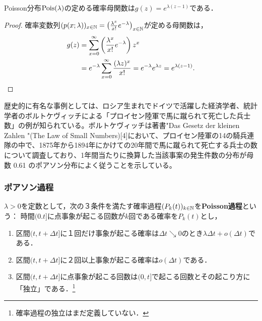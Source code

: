 \documentclass[uplatex,dvipdfmx]{jsreport}
\begin{document}
\begin{proposition}[Poisson分布の確率母関数]
    Poisson分布$\mathrm{Pois}(\lambda)$の定める確率母関数は$g(z)=e^{\lambda(z-1)}$である．
\end{proposition}
\begin{proof}
    確率変数列$(p(x;\lambda))_{x\in\mathbb{N}}=\left(\frac{\lambda^x}{x!}e^{-\lambda}\right)_{x\in\mathbb{N}}$が定める母関数は，
    \begin{align*}
        g(z)&=\sum_{x=0}^\infty \left(\frac{\lambda^x}{x!}e^{-\lambda}\right)z^x\\
        &=e^{-\lambda}\sum_{x=0}^\infty\frac{(\lambda z)^x}{x!}=e^{-\lambda}e^{\lambda z}=e^{\lambda(z-1)}.
    \end{align*}
\end{proof}

\begin{history}
    歴史的に有名な事例としては、ロシア生まれでドイツで活躍した経済学者、統計学者のボルトケヴィッチによる「プロイセン陸軍で馬に蹴られて死亡した兵士数」の例が知られている。ボルトケヴィッチは著書"Das Gesetz der kleinen Zahlen "(The Law of Small Numbers)[4]において、プロイセン陸軍の14の騎兵連隊の中で、1875年から1894年にかけての20年間で馬に蹴られて死亡する兵士の数について調査しており、1年間当たりに換算した当該事案の発生件数の分布が母数 0.61 のポアソン分布によく従うことを示している。 
\end{history}

\subsubsection{ポアソン過程}

\begin{definition}
    $\lambda>0$を定数として，次の３条件を満たす確率過程$(P_k(t))_{k\in\mathbb{N}}$を\textbf{Poisson過程}という：
    時間$(0.t]$に点事象が起こる回数が$k$回である確率を$P_k(t)$とし，
    \begin{enumerate}
        \item 区間$(t,t+\Delta t]$に１回だけ事象が起こる確率は$\Delta t\searrow 0$のとき$\lambda\Delta t+o(\Delta t)$である．
        \item 区間$(t,t+\Delta t]$に２回以上事象が起こる確率は$o(\Delta t)$である．
        \item 区間$(t,t+\Delta t]$に点事象が起こる回数は$(0,t]$で起こる回数とその起こり方に「独立」である．\footnote{確率過程の独立はまだ定義していない．}
    \end{enumerate}
\end{definition}
\end{document}
